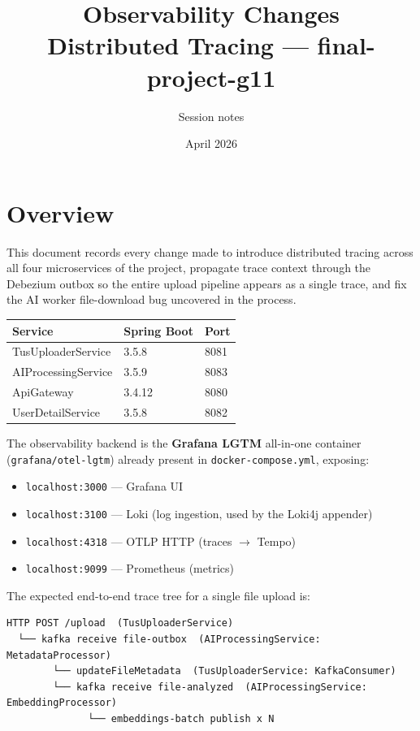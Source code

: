 \documentclass[11pt,a4paper]{article}
\title{\textbf{Observability Changes}\\\large Distributed Tracing --- final-project-g11}
\author{Session notes}
\date{April 2026}
\begin{document}
\maketitle
\tableofcontents
\newpage

\section{Overview}

This document records every change made to introduce distributed tracing across
all four microservices of the project, propagate trace context through the
Debezium outbox so the entire upload pipeline appears as a single trace, and fix
the AI worker file-download bug uncovered in the process.

\medskip
\begin{center}
\begin{tabular}{lll}
\toprule
\textbf{Service} & \textbf{Spring Boot} & \textbf{Port} \\
\midrule
TusUploaderService  & 3.5.8  & 8081 \\
AIProcessingService & 3.5.9  & 8083 \\
ApiGateway          & 3.4.12 & 8080 \\
UserDetailService   & 3.5.8  & 8082 \\
\bottomrule
\end{tabular}
\end{center}

\medskip
The observability backend is the \textbf{Grafana LGTM} all-in-one container
(\texttt{grafana/otel-lgtm}) already present in \texttt{docker-compose.yml},
exposing:
\begin{itemize}[noitemsep]
  \item \texttt{localhost:3000} --- Grafana UI
  \item \texttt{localhost:3100} --- Loki (log ingestion, used by the Loki4j appender)
  \item \texttt{localhost:4318} --- OTLP HTTP (traces $\to$ Tempo)
  \item \texttt{localhost:9099} --- Prometheus (metrics)
\end{itemize}

The expected end-to-end trace tree for a single file upload is:

\begin{lstlisting}[style=code, caption={Trace tree visible in Tempo after all changes}]
HTTP POST /upload  (TusUploaderService)
  └── kafka receive file-outbox  (AIProcessingService: MetadataProcessor)
        └── updateFileMetadata  (TusUploaderService: KafkaConsumer)
        └── kafka receive file-analyzed  (AIProcessingService: EmbeddingProcessor)
              └── embeddings-batch publish x N
\end{lstlisting}
\end{document}

